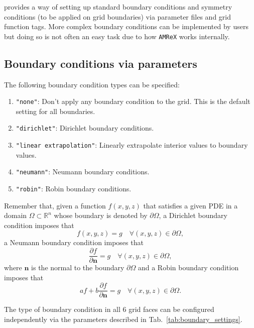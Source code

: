 \CarpetX\space provides a way of setting up standard boundary conditions and symmetry conditions (to be applied on grid boundaries) via parameter files and grid function tags. More complex boundary conditions can be implemented by users but doing so is not often an easy task due to how \texttt{AMReX} works internally.

\subsection{Boundary conditions via parameters}

The following boundary condition types can be specified:

\begin{enumerate}
    \item \texttt{"none"}: Don't apply any boundary condition to the grid. This is the default setting for all boundaries.
    \item \texttt{"dirichlet"}: Dirichlet boundary conditions.
    \item \texttt{"linear extrapolation"}: Linearly extrapolate interior values to boundary values.
    \item \texttt{"neumann"}: Neumann boundary conditions.
    \item \texttt{"robin"}: Robin boundary conditions.
\end{enumerate}

Remember that, given a function $f(x,y,z)$ that satisfies a given PDE in a domain $\Omega \subset \mathbb{R}^n$ whose boundary is denoted by $\partial\Omega$, a Dirichlet boundary condition imposes that
%
\begin{equation}
  f(x,y,z) = g \quad \forall (x,y,z) \in \partial \Omega,
  \label{eq:dirichlet}
\end{equation}
%
a Neumann boundary condition imposes that
%
\begin{equation}
  \frac{\partial f}{\partial \mathbf{n}} = g \quad \forall (x,y,z) \in \partial \Omega,
  \label{eq:neumann}
\end{equation}
%
where $\mathbf{n}$ is the normal to the boundary $\partial \Omega$ and a Robin boundary condition imposes that
%
\begin{equation}
  a f + b \frac{\partial f}{\partial \mathbf{n}} = g \quad \forall (x,y,z) \in \partial \Omega.
  \label{eq:robin}
\end{equation}

The type of boundary condition in all 6 grid faces can be configured independently via the parameters described in Tab.~\ref{tab:boundary_settings}.

